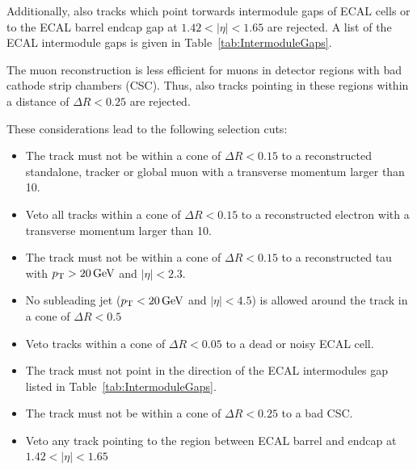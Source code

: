 Additionally, also tracks which point torwards intermodule gaps of ECAL cells or to the ECAL barrel endcap gap at $1.42<|\eta|<1.65$ are rejected.
A list of the ECAL intermodule gaps is given in Table~\ref{tab:IntermoduleGaps}.
\renewcommand{\arraystretch}{1.5}
\begin{table}[!hbt]
\centering
\caption{Intermodule ECAL gaps.}
\label{tab:IntermoduleGaps}
\end{table}  

The muon reconstruction is less efficient for muons in detector regions with bad cathode strip chambers (CSC).
Thus, also tracks pointing in these regions within a distance of $\Delta R<0.25$ are rejected.

These considerations lead to the following selection cuts:

\begin{itemize}
\renewcommand{\labelitemi}{\footnotesize{\ding{118}}}
\item The track must not be within a cone of $\Delta R<0.15$ to a reconstructed standalone, tracker or global muon with a transverse momentum larger than 10\gev.
\item Veto all tracks within a cone of $\Delta R<0.15$ to a reconstructed electron with a transverse momentum larger than 10\gev.
\item The track must not be within a cone of $\Delta R<0.15$ to a reconstructed tau with $p_{\text{T}}>20\,\text{Ge}\kern-0.06667em\text{V}$ and $|\eta|<2.3$.
\item No subleading jet ($p_{\text{T}}<20\,\text{Ge}\kern-0.06667em\text{V}$ and $|\eta|<4.5$) is allowed around the track in a cone of $\Delta R< 0.5$
\item Veto tracks within a cone of $\Delta R<0.05$ to a dead or noisy ECAL cell.
\item The track must not point in the direction of the ECAL intermodules gap listed in Table~\ref{tab:IntermoduleGaps}.
\item The track must not be within a cone of $\Delta R<0.25$ to a bad CSC.
\item Veto any track pointing to the region between ECAL barrel and endcap at $1.42<|\eta|<1.65$
\end{itemize}

